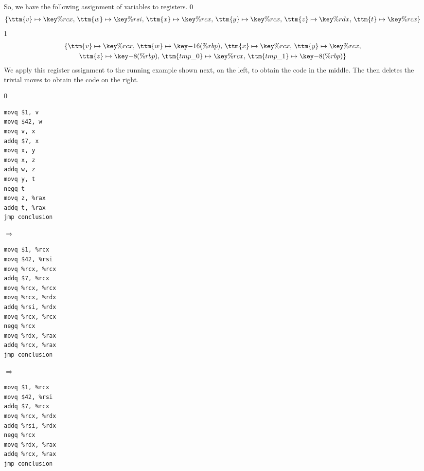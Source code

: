 \documentclass[7x10]{TimesAPriori_MIT}%
\def\racketEd{0}
\def\pythonEd{1}
\providecommand{\BookEdition}{1}
\let\edition\BookEdition
\newcommand{\pythonColor}[0]{}
\numberwithin{theorem}{chapter}
\numberwithin{definition}{chapter}
\numberwithin{equation}{chapter}
\begin{document}
So, we have the following assignment of variables to registers.
{\if\edition\racketEd
\begin{gather*}
  \{ \ttm{v} \mapsto \key{\%rcx}, \,
     \ttm{w} \mapsto \key{\%rsi}, \,
     \ttm{x} \mapsto \key{\%rcx}, \,
     \ttm{y} \mapsto \key{\%rcx}, \,
     \ttm{z} \mapsto \key{\%rdx}, \,
     \ttm{t} \mapsto \key{\%rcx} \}
\end{gather*}
\fi}
{\if\edition\pythonEd\pythonColor
\begin{gather*}
  \{ \ttm{v} \mapsto \key{\%rcx}, \,
     \ttm{w} \mapsto \key{-16(\%rbp)}, \,
     \ttm{x} \mapsto \key{\%rcx}, \,
     \ttm{y} \mapsto \key{\%rcx}, \\
     \ttm{z} \mapsto \key{-8(\%rbp)}, \,
     \ttm{tmp\_0} \mapsto \key{\%rcx}, \,
     \ttm{tmp\_1} \mapsto \key{-8(\%rbp)} \}
\end{gather*}
\fi}
%
We apply this register assignment to the running example shown next,
on the left, to obtain the code in the middle.  The
 then deletes the trivial moves to obtain
the code on the right.

{\if\edition\racketEd
\begin{center}  
\begin{minipage}{0.2\textwidth}
\begin{lstlisting}
movq $1, v
movq $42, w
movq v, x
addq $7, x
movq x, y
movq x, z
addq w, z
movq y, t
negq t
movq z, %rax
addq t, %rax
jmp conclusion
\end{lstlisting}
\end{minipage}
$\Rightarrow\qquad$
\begin{minipage}{0.25\textwidth}
\begin{lstlisting}
movq $1, %rcx
movq $42, %rsi
movq %rcx, %rcx
addq $7, %rcx
movq %rcx, %rcx
movq %rcx, %rdx
addq %rsi, %rdx
movq %rcx, %rcx
negq %rcx
movq %rdx, %rax
addq %rcx, %rax
jmp conclusion
\end{lstlisting}
\end{minipage}
$\Rightarrow\qquad$
\begin{minipage}{0.23\textwidth}
\begin{lstlisting}
movq $1, %rcx
movq $42, %rsi
addq $7, %rcx
movq %rcx, %rdx
addq %rsi, %rdx
negq %rcx
movq %rdx, %rax
addq %rcx, %rax
jmp conclusion
\end{lstlisting}
\end{minipage}
\end{center}
\fi}
\end{document}

